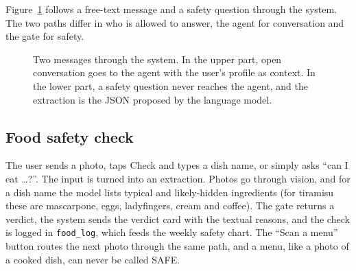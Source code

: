 \documentclass[11pt,a4paper]{article}
\begin{document}
Figure~\ref{fig:seq} follows a free-text message and a safety question through the system. The two
paths differ in who is allowed to answer, the agent for conversation and the gate for safety.

\begin{figure}[H]
\centering
{}
\caption{Two messages through the system. In the upper part, open conversation goes to the agent with
the user's profile as context. In the lower part, a safety question never reaches the agent, and the
extraction is the JSON proposed by the language model.}
\label{fig:seq}
\end{figure}

\subsection{Food safety check}

The user sends a photo, taps Check and types a dish name, or simply asks ``can I eat \ldots?''. The
input is turned into an extraction. Photos go through vision, and for a dish name the model lists
typical and likely-hidden ingredients (for tiramisu these are mascarpone, eggs, ladyfingers, cream and
coffee). The gate returns a verdict, the system sends the verdict card with the textual reasons, and the
check is logged in \texttt{food\_log}, which feeds the weekly safety chart. The ``Scan a menu'' button
routes the next photo through the same path, and a menu, like a photo of a cooked dish, can never be
called SAFE.
\end{document}
